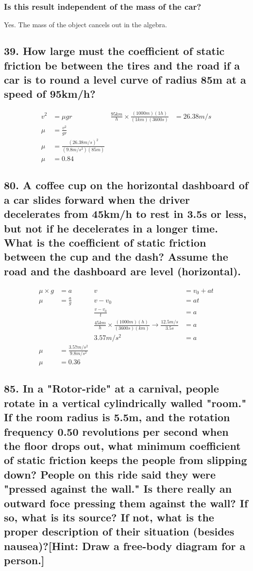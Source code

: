 \documentclass[12pt,a4paper,english]{article}
\begin{document}
\begin{flushleft}
  \subsubsection{Is this result independent of the mass of the car?}
  Yes. The mass of the object cancels out in the algebra.
  \subsection{39. How large must the coefficient of static friction be between the tires and the road if a car is to round a level curve of radius 85m at a speed of 95km/h?}
  \begin{align*}
    v^2&=\mu gr & 
    \frac{95km}{h}\times\frac{(1000m)(1h)}{(1km)(3600s)}&=26.38m/s
    \\
    \mu&=\frac{v^2}{gr}
    \\
    \mu&=\frac{(26.38m/s)^2}{(9.8m/s^2)(85m)}
    \\
    \mu&=0.84
  \end{align*}
  \subsection{80. A coffee cup on the horizontal dashboard of a car slides forward when the driver decelerates from 45km/h to rest in 3.5s or less, but not if he decelerates in a longer time. What is the coefficient of static friction between the cup and the dash? Assume the road and the dashboard are level (horizontal).}
  \begin{align*}
    \mu\times g&=a
               &v&=v_0+at
               \\
              \mu&=\frac{a}{g}&v-v_0&=at
               \\
               &&\frac{v-v_0}{t}&=a 
               \\
               && \frac{45km}{h}\times\frac{(1000m)(h)}{(3600s)(km)}\rightarrow\frac{12.5m/s}{3.5s}&=a
               \\
               &&3.57m/s^2&=a
               \\
    \mu&=\frac{3.57m/s^2}{9.8m/s^2}
    \\
    \mu&=0.36
  \end{align*}
  \subsection{85. In a "Rotor-ride" at a carnival, people rotate in a vertical cylindrically walled "room." If the room radius is 5.5m, and the rotation frequency 0.50 revolutions per second when the floor drops out, what minimum coefficient of static friction keeps the people from slipping down? People on this ride said they were "pressed against the wall." Is there really an outward foce pressing them against the wall? If so, what is its source? If not, what is the proper description of their situation (besides nausea)?[Hint: Draw a free-body diagram for a person.]}
\end{flushleft}
\end{document}
